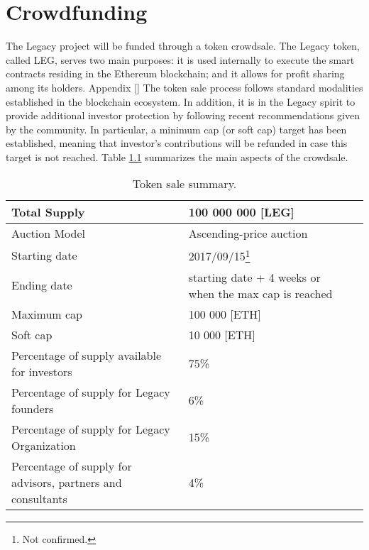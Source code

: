 \chapter{Crowdfunding} %
\label{cha:crowdfunding}

The Legacy project will be funded through a token crowdsale. The Legacy token, called LEG, serves two main purposes: it is used internally to execute the smart contracts residing in the Ethereum blockchain; and it allows for profit sharing among its holders.  Appendix \ref{} The token sale process follows standard modalities established in the blockchain ecosystem. In addition, it is in the Legacy spirit to provide additional investor protection by following recent recommendations given by the community. In particular, a minimum cap (or soft cap) target has been established, meaning that investor’s contributions will be refunded in case this target is not reached. Table \ref{table:ico_summary} summarizes the main aspects of the crowdsale.

\begin{table}[h]
	\begin{center}
			\small
			\begin{tabular}{| l | p{5cm} | p{3cm}  |}	
		    \hline	
		    	Total Supply		&  100 000 000 [LEG]  \\ \hline
		    	Auction Model       &  Ascending-price auction \\ \hline
				Starting date       &  2017/09/15\footnote{Not confirmed.} \\ \hline
				Ending date         &  starting date + 4 weeks or when the max cap is reached \\ \hline
				Maximum cap         &  100 000 [ETH] \\ \hline
				Soft cap            &  10 000 [ETH] \\ \hline
				Percentage of supply available for investors & 75\% \\ \hline
				Percentage of supply for Legacy founders     &  6\% \\ \hline
				Percentage of supply for Legacy Organization & 15\% \\ \hline
				Percentage of supply for advisors, partners and consultants & 4\% \\ \hline
			\hline	
			\end{tabular}				
	\caption{Token sale summary.}
	\label{table:ico_summary}		
	\end{center}
\end{table}


